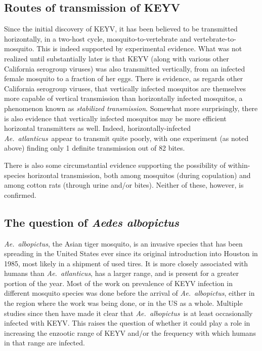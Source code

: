 \documentclass[12pt]{article}
\newcommand{\alb}{\textit{Ae.\ albopictus}}
\newcommand{\atl}{\textit{Ae.\ atlanticus}}
\begin{document}
        \subsection{Routes of transmission of KEYV}
            \label{transmission-routes}
            Since the initial discovery of KEYV, it has been believed to be transmitted horizontally, in a two-host cycle, mosquito-to-vertebrate and vertebrate-to-mosquito. This is indeed supported by experimental evidence. What was not realized until substantially later is that KEYV (along with various other California serogroup viruses) was also transmitted vertically, from an infected female mosquito to a fraction of her eggs. There is evidence, as regards other California serogroup viruses, that vertically infected mosquitos are themselves more capable of vertical transmission than horizontally infected mosquitos, a phenomenon known as \textit{stabilized transmission}. Somewhat more surprisingly, there is also evidence that vertically infected mosquitos may be more efficient horizontal transmitters as well. Indeed, horizontally-infected \atl\ appear to transmit quite poorly, with one experiment (as noted above) finding only 1 definite transmission out of 82 bites.\cite{watts1988maintenance}

            There is also some circumstantial evidence supporting the possibility of within-species horizontal transmission, both among mosquitos (during copulation)\cite{asdf} and among cotton rats (through urine and/or bites)\cite{taylor1971california}. Neither of these, however, is confirmed.

        \subsection{The question of \textit{Aedes albopictus}}
            \label{albopictus}
            \alb, the Asian tiger mosquito, is an invasive species that has been spreading in the United States ever since its original introduction into Houston in 1985, most likely in a shipment of used tires. It is more closely associated with humans than \atl, has a larger range, and is present for a greater portion of the year. Most of the work on prevalence of KEYV infection in different mosquito species was done before the arrival of \alb, either in the region where the work was being done, or in the US as a whole. Multiple studies since then have made it clear that \alb\ is at least occasionally infected with KEYV. This raises the question of whether it could play a role in increasing the enzootic range of KEYV and/or the frequency with which humans in that range are infected.
\end{document}
